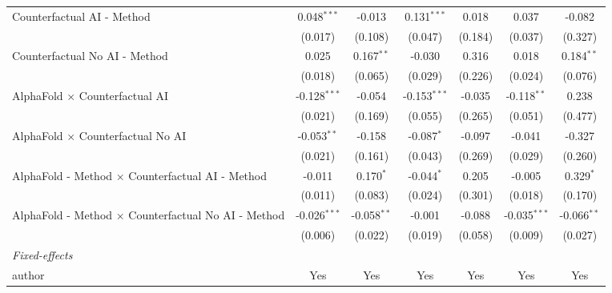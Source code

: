 \begin{tabular}{lcccccc}
   Counterfactual AI - Method                                 & 0.048$^{***}$  & -0.013        & 0.131$^{***}$  & 0.018   & 0.037          & -0.082\\   
                                                              & (0.017)        & (0.108)       & (0.047)        & (0.184) & (0.037)        & (0.327)\\   
   Counterfactual No AI - Method                              & 0.025          & 0.167$^{**}$  & -0.030         & 0.316   & 0.018          & 0.184$^{**}$\\   
                                                              & (0.018)        & (0.065)       & (0.029)        & (0.226) & (0.024)        & (0.076)\\   
   AlphaFold $\times$ Counterfactual AI                       & -0.128$^{***}$ & -0.054        & -0.153$^{***}$ & -0.035  & -0.118$^{**}$  & 0.238\\   
                                                              & (0.021)        & (0.169)       & (0.055)        & (0.265) & (0.051)        & (0.477)\\   
   AlphaFold $\times$ Counterfactual No AI                    & -0.053$^{**}$  & -0.158        & -0.087$^{*}$   & -0.097  & -0.041         & -0.327\\   
                                                              & (0.021)        & (0.161)       & (0.043)        & (0.269) & (0.029)        & (0.260)\\   
   AlphaFold - Method $\times$ Counterfactual AI - Method     & -0.011         & 0.170$^{*}$   & -0.044$^{*}$   & 0.205   & -0.005         & 0.329$^{*}$\\   
                                                              & (0.011)        & (0.083)       & (0.024)        & (0.301) & (0.018)        & (0.170)\\   
   AlphaFold - Method $\times$ Counterfactual No AI - Method  & -0.026$^{***}$ & -0.058$^{**}$ & -0.001         & -0.088  & -0.035$^{***}$ & -0.066$^{**}$\\   
                                                              & (0.006)        & (0.022)       & (0.019)        & (0.058) & (0.009)        & (0.027)\\   
   \midrule
   \emph{Fixed-effects}\\
   author                                                     & Yes            & Yes           & Yes            & Yes     & Yes            & Yes\\  

\end{tabular}

